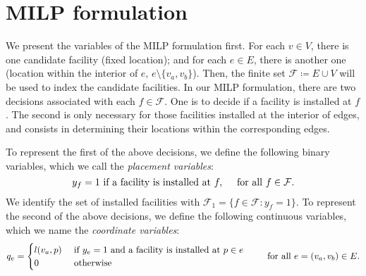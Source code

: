 \documentclass[review]{elsarticle}
\newcommand{\cF}{{\mathcal F}}
\theoremstyle{definition}
\begin{document}
\begin{comment}
Otherwise, it has to be $e' \cap l^*_{a} = v'_a$ and  $e' \cap l^*_{b} = v'_b$. Path $l^*$ is the shortest one between $l^*_{a} \cup (v'_a,p)$ and $l^*_{b} \cup (p, v'_b)$. Since $|l^*_{a} \cup (v'_a,p)| = |l^*_{a}| + q_{e'}$ and $|l^*_{a} \cup (p,v'_b)| = |l^*_{b}| + l_{e'} - q_{e'}$, it follows that
\begin{equation*}
\begin{split}
	d(v_{i}, p) = |l^*|&=\min\{ |l^*_{a}| + q_{e'},  |l^*_{b}| + l_{e'} - q_{e'}\}\\\
	&=\min_{i' \in \{a,b\}} |l^*_{i'}|+\mathbb{1}_{i'=a}q_{e'} +\mathbb{1}_{i'=b}(l_{e'} - q_{e'})\\
	&=\min_{i' \in \{a,b\}} d(v_i, v'_{i'})+\mathbb{1}_{i'=a}q_{e'} +\mathbb{1}_{i'=b}(l_{e'} - q_{e'})= \min_{i'\in\{a,b\}}  \{\tau_{ve'i'}(q_{e'})\}.
\end{split}
\end{equation*}
\end{proof}
\end{comment}

\section{MILP formulation}\label{sec:milp}


We present the variables of the MILP formulation first. For each $v \in V$, there is one candidate facility (fixed location); and for each $e \in E$, there is another one (location within the interior of $e$, $e\setminus\{v_a,v_b\}$). Then, the finite set $\cF \coloneqq E \cup V$ will be used to index the candidate facilities.
In our MILP formulation, there are two decisions associated with each  $f\in \cF$. One is to decide if a facility is installed at $f$. The second is only necessary for those facilities installed at the interior of edges, and consists in determining their locations within the corresponding edges.

To represent the first of the above decisions, we define the following binary variables, which we call the \emph{placement variables}:
$$y_f=1 \textup{ if a facility  is installed at } f,\quad  \textup{ for all }f \in \cF.$$
We identify the set of installed facilities with $\cF_1 = \{f \in \cF: y_f = 1\}$. To represent the second of the above decisions, we define the following continuous variables, which we name the \emph{coordinate variables}:
$$q_e=
\begin{cases}
l(v_a,p) &\textup{ if } y_e=1 \textup{ and a facility is installed at } p\in e\\
0 &\textup{ otherwise}
\end{cases}
\qquad \textup{ for all }e=(v_a,v_b)\in E.$$
\end{document}
